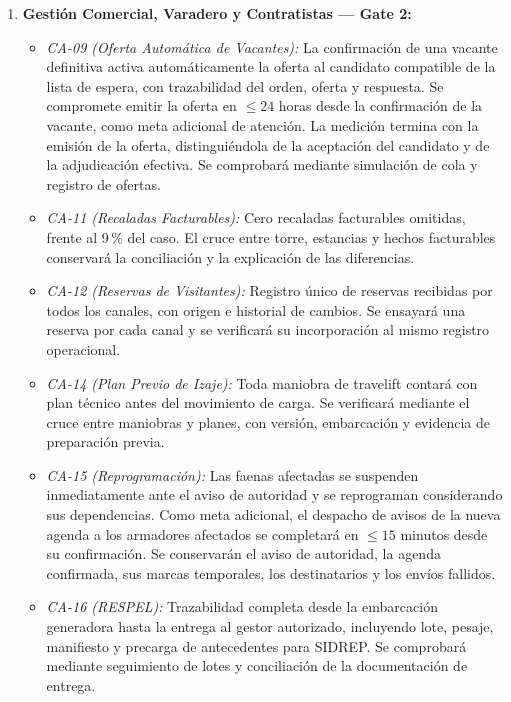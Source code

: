 \begin{enumerate}
    \item \textbf{Gestión Comercial, Varadero y Contratistas --- Gate 2:}
    \begin{itemize}
        \item \emph{CA-09 (Oferta Automática de Vacantes):} La confirmación de una vacante definitiva activa automáticamente la oferta al candidato compatible de la lista de espera, con trazabilidad del orden, oferta y respuesta. Se compromete emitir la oferta en $\le 24$ horas desde la confirmación de la vacante, como meta adicional de atención. La medición termina con la emisión de la oferta, distinguiéndola de la aceptación del candidato y de la adjudicación efectiva. Se comprobará mediante simulación de cola y registro de ofertas.

        \item \emph{CA-11 (Recaladas Facturables):} Cero recaladas facturables omitidas, frente al 9\,\% del caso. El cruce entre torre, estancias y hechos facturables conservará la conciliación y la explicación de las diferencias.

        \item \emph{CA-12 (Reservas de Visitantes):} Registro único de reservas recibidas por todos los canales, con origen e historial de cambios. Se ensayará una reserva por cada canal y se verificará su incorporación al mismo registro operacional.

        \item \emph{CA-14 (Plan Previo de Izaje):} Toda maniobra de travelift contará con plan técnico antes del movimiento de carga. Se verificará mediante el cruce entre maniobras y planes, con versión, embarcación y evidencia de preparación previa.

        \item \emph{CA-15 (Reprogramación):} Las faenas afectadas se suspenden inmediatamente ante el aviso de autoridad y se reprograman considerando sus dependencias. Como meta adicional, el despacho de avisos de la nueva agenda a los armadores afectados se completará en $\le 15$ minutos desde su confirmación. Se conservarán el aviso de autoridad, la agenda confirmada, sus marcas temporales, los destinatarios y los envíos fallidos.

        \item \emph{CA-16 (RESPEL):} Trazabilidad completa desde la embarcación generadora hasta la entrega al gestor autorizado, incluyendo lote, pesaje, manifiesto y precarga de antecedentes para SIDREP. Se comprobará mediante seguimiento de lotes y conciliación de la documentación de entrega.


\end{itemize}
\end{enumerate}
